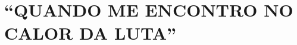 \documentclass[
	12pt,				%
	oneside,
	a4paper,			%
	english,			%
	spanish,			%
	brazil				%
	]{abntex2}
\begin{document}



\tableofcontents*
\cleardoublepage



\textual

\chapter*[Introduction. QUANDO ME ENCONTRO NO CALOR DA LUTA]{ “QUANDO ME ENCONTRO NO CALOR DA LUTA”}



\end{document}
